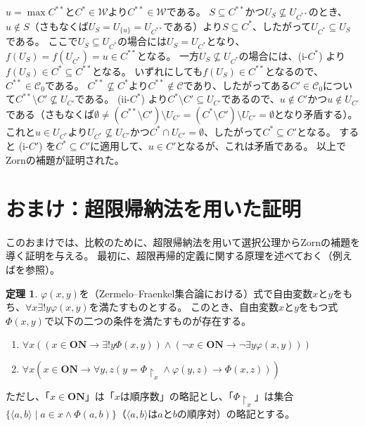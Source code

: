 ﻿\documentclass{ltjsarticle}
\theoremstyle{definition}
\newtheorem{theorem}{定理}
\begin{document}
$u = \max C^{**}$と$C^* \in \mathcal{W}$より$C^{**} \in \mathcal{W}$である。
$S \subseteq C^{**}$かつ$U_S \not\subseteq U_{C^{**}}$のとき、$u \not\in S$（さもなくば$U_S = U_{\{u\}} = U_{C^{**}}$である）より$S \subseteq C^*$、したがって$U_{C^*} \subseteq U_S$である。
ここで$U_S \subseteq U_{C^*}$の場合には$U_S = U_{C^*}$となり、$f(U_S) = f(U_{C^*}) = u \in C^{**}$となる。
一方$U_S \not\subseteq U_{C^*}$の場合には、(i-$C^*$) より$f(U_S) \in C^* \subseteq C^{**}$となる。
いずれにしても$f(U_S) \in C^{**}$となるので、$C^{**} \in \mathcal{C}_0$である。
$C^{**} \not\subseteq C^*$より$C^{**} \not\in \mathcal{C}$であり、したがってある$C' \in \mathcal{C}_0$について$C^{**} \setminus C' \not\subseteq U_{C'}$である。
(ii-$C^*$) より$C^* \setminus C' \subseteq U_{C'}$であるので、$u \not\in C'$かつ$u \not\in U_{C'}$である（さもなくば$\emptyset \neq (C^{**} \setminus C') \setminus U_{C'} = (C^* \setminus C') \setminus U_{C'} = \emptyset$となり矛盾する）。
これと$u \in U_{C^*}$より$U_{C^*} \not\subseteq U_{C'}$かつ$C^* \cap U_{C'} = \emptyset$、したがって$C^* \subseteq C'$となる。
すると (i-$C'$) を$C^* \subseteq C'$に適用して、$u \in C'$となるが、これは矛盾である。
以上でZornの補題が証明された。


\section*{おまけ：超限帰納法を用いた証明}

このおまけでは、比較のために、超限帰納法を用いて選択公理からZornの補題を導く証明を与える。
最初に、超限再帰的定義に関する原理を述べておく（例えば\cite[第I章定理9.3]{Kunen}を参照）。

\begin{theorem}
    \label{thm:transfinite_induction}
    $\varphi(x,y)$を（Zermelo--Fraenkel集合論における）式で自由変数$x$と$y$をもち、$\forall x \exists! y \varphi(x,y)$を満たすものとする。
    このとき、自由変数$x$と$y$をもつ式$\Phi(x,y)$で以下の二つの条件を満たすものが存在する。
    \begin{enumerate}
        \item $\forall x ( (x \in \mathbf{ON} \to \exists! y \Phi(x,y)) \land (\neg x \in \mathbf{ON} \to \neg\exists y \varphi(x,y) ) )$
        \item $\forall x ( x \in \mathbf{ON} \to \forall y,z ( y = \Phi\!\upharpoonright_x \land \varphi(y,z) \to \Phi(x,z) ) )$
    \end{enumerate}
    ただし、「$x \in \mathbf{ON}$」は「$x$は順序数」の略記とし、「$\Phi\!\upharpoonright_x$」は集合$\{\langle a,b \rangle \mid a \in x \land \Phi(a,b)\}$（$\langle a,b \rangle$は$a$と$b$の順序対）の略記とする。
\end{theorem}
\end{document}
